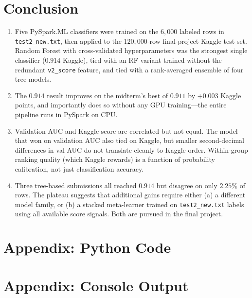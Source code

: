 \documentclass[12pt]{article}
\begin{document}
	\newpage
	\section{Conclusion}

	\begin{enumerate}
		\item Five PySpark.ML classifiers were trained on the $6{,}000$ labeled rows in \texttt{test2\_new.txt}, then applied to the $120{,}000$-row final-project Kaggle test set. Random Forest with cross-validated hyperparameters was the strongest single classifier ($0.914$ Kaggle), tied with an RF variant trained without the redundant \texttt{v2\_score} feature, and tied with a rank-averaged ensemble of four tree models.
		\item The $0.914$ result improves on the midterm's best of $0.911$ by $+0.003$ Kaggle points, and importantly does so without any GPU training---the entire pipeline runs in PySpark on CPU.
		\item Validation AUC and Kaggle score are correlated but not equal. The model that won on validation AUC also tied on Kaggle, but smaller second-decimal differences in val AUC do not translate cleanly to Kaggle order. Within-group ranking quality (which Kaggle rewards) is a function of probability calibration, not just classification accuracy.
		\item Three tree-based submissions all reached $0.914$ but disagree on only $2.25\%$ of rows. The plateau suggests that additional gains require either (a) a different model family, or (b) a stacked meta-learner trained on \texttt{test2\_new.txt} labels using all available score signals. Both are pursued in the final project.
	\end{enumerate}

	\newpage
	\section{Appendix: Python Code}\label{sec:code}

	

	\newpage
	\section{Appendix: Console Output}

	
\end{document}
